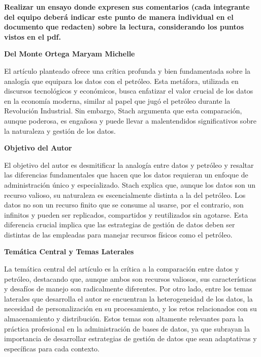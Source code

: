 \begin{center}
\textbf{Realizar un ensayo donde expresen sus comentarios (cada integrante del equipo deberá indicar este punto de manera individual en el documento que redacten) sobre la lectura, considerando los puntos vistos en el pdf.}\\
\end{center}

\begin{center}
    \textbf{Del Monte Ortega Maryam Michelle} 
\end{center}

El artículo planteado ofrece una crítica profunda y bien fundamentada sobre la analogía que equipara los datos con el petróleo. Esta metáfora, utilizada en discursos tecnológicos y económicos, busca enfatizar el valor crucial de los datos en la economía moderna, similar al papel que jugó el petróleo durante la Revolución Industrial. Sin embargo, Stach argumenta que esta comparación, aunque poderosa, es engañosa y puede llevar a malentendidos significativos sobre la naturaleza y gestión de los datos.

\textbf{Objetivo del Autor}

El objetivo del autor es desmitificar la analogía entre datos y petróleo y resaltar las diferencias fundamentales que hacen que los datos requieran un enfoque de administración único y especializado. Stach explica que, aunque los datos son un recurso valioso, su naturaleza es escencialmente distinta a la del petróleo. Los datos no son un recurso finito que se consume al usarse, por el contrario, son infinitos y pueden ser replicados, compartidos y reutilizados sin agotarse. Esta diferencia crucial implica que las estrategias de gestión de datos deben ser distintas de las empleadas para manejar recursos físicos como el petróleo.

\textbf{Temática Central y Temas Laterales}

La temática central del artículo es la crítica a la comparación entre datos y petróleo, destacando que, aunque ambos son recursos valiosos, sus características y desafíos de manejo son radicalmente diferentes. Por otro lado, entre los temas laterales que desarrolla el autor se encuentran la heterogeneidad de los datos, la necesidad de personalización en su procesamiento, y los retos relacionados con su almacenamiento y distribución. Estos temas son altamente relevantes para la práctica profesional en la administración de bases de datos, ya que subrayan la importancia de desarrollar estrategias de gestión de datos que sean adaptativas y específicas para cada contexto. 

